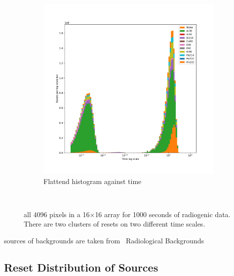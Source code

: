\begin{figure}
\begin{subfigure}{.5\textwidth}
  \includegraphics[width=\textwidth]{images/radiogenicRTDtimescale_stack_1d_noise.pdf}
  \caption{Flattend histogram against time}
\end{subfigure}
\caption{all 4096 pixels in a 16$\times$16 array for 1000 seconds of radiogenic data. 
There are two clusters of resets on two different time scales.}
~\label{fig:radiogenic_rtd_timescales_comparing_no_noise}
\end{figure}

sources of backgrounds are taken from~\citep{DUNE-FD_TDRv4:Abi_2020}
Radiological Backgrounds~\citep{ar39_backgrounds, phd_backgrounds}


\subsection{Reset Distribution of Sources}



